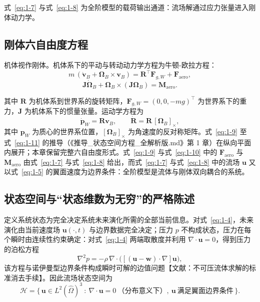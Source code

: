 \documentclass[11pt,a4paper]{ctexart}
\numberwithin{equation}{section}
\begin{document}
式~\eqref{eq:1-7} 与式~\eqref{eq:1-8} 为全阶模型的载荷输出通道：流场解通过应力张量进入刚体动力学。

\subsection{刚体六自由度方程}

机体视作刚体。机体系下的平动与转动动力学方程为牛顿-欧拉方程：
\begin{equation}
  m\,(\dot{\bm{v}}_B + \bm{\Omega}_B \times \bm{v}_B) = \bm{R}^{\top}\bm{F}_{g,W} + \bm{F}_{\text{aero}}, \label{eq:1-9}
\end{equation}
\begin{equation}
  \bm{J}\dot{\bm{\Omega}}_B + \bm{\Omega}_B \times (\bm{J}\bm{\Omega}_B) = \bm{M}_{\text{aero}}. \label{eq:1-10}
\end{equation}

其中 $\bm{R}$ 为机体系到世界系的旋转矩阵，$\bm{F}_{g,W} = (0, 0, -mg)^{\top}$ 为世界系下的重力，$\bm{J}$ 为机体系下的惯量张量。运动学方程为
\begin{equation}
  \dot{\bm{p}}_W = \bm{R}\bm{v}_B, \qquad \dot{\bm{R}} = \bm{R}\,[\bm{\Omega}_B]_\times, \label{eq:1-11}
\end{equation}
其中 $\bm{p}_W$ 为质心的世界系位置，$[\bm{\Omega}_B]_\times$ 为角速度的反对称矩阵。式~\eqref{eq:1-9} 至式~\eqref{eq:1-11} 的推导（《推导\_状态空间方程\_全解析版.md》第 1 章）在纵向平面内展开；本章保留完整六自由度形式。式~\eqref{eq:1-9} 与式~\eqref{eq:1-10} 中的 $\bm{F}_{\text{aero}}$ 与 $\bm{M}_{\text{aero}}$ 由式~\eqref{eq:1-7} 与式~\eqref{eq:1-8} 给出，而式~\eqref{eq:1-7} 与式~\eqref{eq:1-8} 中的流场 $\bm{u}$ 又以式~\eqref{eq:1-5} 的翼面速度为边界条件：全阶模型是流体与刚体双向耦合的系统。

\subsection{状态空间与“状态维数为无穷”的严格陈述}

定义系统状态为完全决定系统未来演化所需的全部当前信息。对式~\eqref{eq:1-4}，未来演化由当前速度场 $\bm{u}(\cdot, t)$ 与边界数据完全决定；压力 $p$ 不构成状态，压力在每个瞬时由连续性约束确定：对式~\eqref{eq:1-4} 两端取散度并利用 $\nabla\cdot\bm{u} = 0$，得到压力的泊松方程
\begin{equation}
  \nabla^2 p = -\rho\,\nabla\cdot\bigl([(\bm{u} - \bm{w})\cdot\nabla]\bm{u}\bigr), \label{eq:1-12}
\end{equation}
该方程与诺伊曼型边界条件构成瞬时可解的边值问题【文献：不可压流体求解的标准消去手续】。因此流场状态空间为
\begin{equation}
  \mathcal{H} = \bigl\{\, \bm{u} \in L^2(\hat{\Omega})^3 \ :\ \nabla\cdot\bm{u} = 0\ \text{（分布意义下）},\ \bm{u}\ \text{满足翼面边界条件} \,\bigr\}. \label{eq:1-13}
\end{equation}
\end{document}
